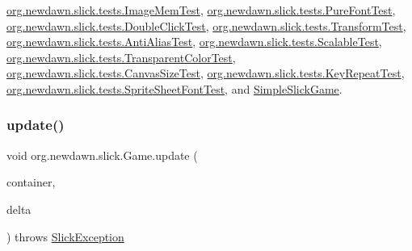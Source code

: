 \mbox{\hyperlink{classorg_1_1newdawn_1_1slick_1_1tests_1_1_image_mem_test_a9ad05ee3e18b0cf40911c877d3ac673e}{org.\+newdawn.\+slick.\+tests.\+Image\+Mem\+Test}}, \mbox{\hyperlink{classorg_1_1newdawn_1_1slick_1_1tests_1_1_pure_font_test_a2a5d9e4f0b8dc1a768304c9747cede17}{org.\+newdawn.\+slick.\+tests.\+Pure\+Font\+Test}}, \mbox{\hyperlink{classorg_1_1newdawn_1_1slick_1_1tests_1_1_double_click_test_ab6ee51a36736c603dad7aa7e89dc7ff1}{org.\+newdawn.\+slick.\+tests.\+Double\+Click\+Test}}, \mbox{\hyperlink{classorg_1_1newdawn_1_1slick_1_1tests_1_1_transform_test_a928dd1a413227df47f44cf4d9ab05b98}{org.\+newdawn.\+slick.\+tests.\+Transform\+Test}}, \mbox{\hyperlink{classorg_1_1newdawn_1_1slick_1_1tests_1_1_anti_alias_test_a4700b49db72f7e2c111f0e7bb1af77e9}{org.\+newdawn.\+slick.\+tests.\+Anti\+Alias\+Test}}, \mbox{\hyperlink{classorg_1_1newdawn_1_1slick_1_1tests_1_1_scalable_test_a56ccbb0f6633035a9901e9605e17b626}{org.\+newdawn.\+slick.\+tests.\+Scalable\+Test}}, \mbox{\hyperlink{classorg_1_1newdawn_1_1slick_1_1tests_1_1_transparent_color_test_a57d3cf6863b720b004dff812d8d9b89c}{org.\+newdawn.\+slick.\+tests.\+Transparent\+Color\+Test}}, \mbox{\hyperlink{classorg_1_1newdawn_1_1slick_1_1tests_1_1_canvas_size_test_a11b37e926c399dee2d9297bc036dfbfa}{org.\+newdawn.\+slick.\+tests.\+Canvas\+Size\+Test}}, \mbox{\hyperlink{classorg_1_1newdawn_1_1slick_1_1tests_1_1_key_repeat_test_aaf889452510bb798a5827b2aad390dd1}{org.\+newdawn.\+slick.\+tests.\+Key\+Repeat\+Test}}, \mbox{\hyperlink{classorg_1_1newdawn_1_1slick_1_1tests_1_1_sprite_sheet_font_test_ae5d38e883f23a0c129f0138eaa90af3e}{org.\+newdawn.\+slick.\+tests.\+Sprite\+Sheet\+Font\+Test}}, and \mbox{\hyperlink{class_simple_slick_game_a7c65120173cde5294f3c4b7aa733b00a}{Simple\+Slick\+Game}}.

\mbox{\label{interfaceorg_1_1newdawn_1_1slick_1_1_game_ab07b2e9463ee4631620dde0de25bdee8}} 
\subsubsection{\texorpdfstring{update()}{update()}}
{\footnotesize\ttfamily void org.\+newdawn.\+slick.\+Game.\+update (\begin{DoxyParamCaption}\item[{\mbox{\hyperlink{classorg_1_1newdawn_1_1slick_1_1_game_container}{Game\+Container}}}]{container,  }\item[{int}]{delta }\end{DoxyParamCaption}) throws \mbox{\hyperlink{classorg_1_1newdawn_1_1slick_1_1_slick_exception}{Slick\+Exception}}}

